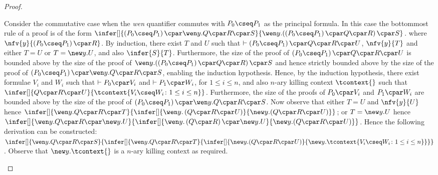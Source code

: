 \begin{proof}
\begin{enumerate}[label=\textbf{\Alph*},ref=\Alph*,leftmargin=*]
{Consider the commutative case when the \textit{wen} quantifier commutes with $P_0 \cseq P_1$ as the principal formula.
In this case the bottommost rule of a proof is of the form $
\infer[]{
\left( P_0 \cseq P_1 \right) \cpar \wen y. Q \cpar R \cpar S
}{
\mathopen{\wen y.} \left( \left( P_0 \cseq P_1 \right) \cpar Q \cpar R\right) \cpar S
}$. where $\nfv{y}{\left( P_0 \cseq P_1 \right) \cpar R}$.
By induction, there exist $T$ and $U$ such that $\vdash \left( P_0 \cseq P_1 \right) \cpar Q \cpar R \cpar U$, $\nfv{y}{T}$ and either $T = U$ or $T = \new y. U$, and also
$\infer{S}{T}$.
Furthermore, the size of the proof of $\left( P_0 \cseq P_1 \right) \cpar Q \cpar R \cpar U$ is bounded above by the size of the proof of $\mathopen{\wen y.} \left( \left( P_0 \cseq P_1 \right) \cpar Q \cpar R\right) \cpar S$ and hence strictly bounded above by the size of the proof of $\left( P_0 \cseq P_1 \right) \cpar \wen y. Q \cpar R \cpar S$, enabling the induction hypothesis.
Hence, by the induction hypothesis, there exist formulae $V_i$ and $W_i$ such that $\vdash P_0 \cpar V_i$ and $\vdash P_1 \cpar W_i$, for $1 \leq i \leq n$, and also $n$-ary killing context $\tcontext{}$ such that
$
\infer[]{
Q \cpar R \cpar U 
}{
 \tcontext{ V_i \cseq W_i \colon 1 \leq i \leq n }
}$.
Furthermore, the size of the proofs of $P_0 \cpar V_i$ and $P_1 \cpar W_i$ are bounded above by the size of the proof of $\left( P_0 \cseq P_1 \right) \cpar \wen y. Q \cpar R \cpar S$.
Now observe that either $T = U$ and $\nfv{y}{U}$ hence
$
\infer[]{
\wen y. Q \cpar R \cpar T
}{
\infer[]{
 \wen y. \left(Q \cpar R \cpar U\right) 
}{ \mathopen{\new y.} \left(Q \cpar R \cpar U\right)
}}$;
or $T = \new y. U$ hence $
\infer[]{
\wen y. Q \cpar R \cpar \new y. U
}{
\infer[]{
 \wen y. \left(Q \cpar R\right) \cpar \new y. U 
}{
 \mathopen{\new y.} \left(Q \cpar R \cpar U\right)
}}$.
Hence the following derivation can be constructed:
$
\infer[]{
\wen y. Q \cpar R \cpar S
}{
\infer[]{
\wen y. Q \cpar R \cpar T
}{
\infer[]{
\mathopen{\new y.} \left( Q \cpar R \cpar U \right)
}{
\mathopen{\new y.} \tcontext{ V_i \cseq W_i \colon 1 \leq i \leq n }
}}}
$.
Observe that $\new y. \tcontext{ }$ is a $n$-ary killing context as required.
\smallskip




}
\end{enumerate}
\end{proof}
